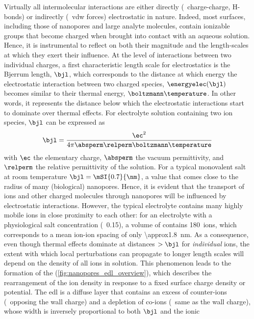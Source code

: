 %

Virtually all intermolecular interactions are either directly (\eg~charge-charge, H-bonds) or indirectly
(\eg~\gls{vdw} forces) electrostatic in nature. Indeed, most surfaces, including those of nanopores and large
analyte molecules, contain ionizable groups that become charged when brought into contact with an aqueous
solution. Hence, it is instrumental to reflect on both their magnitude and the length-scales at which they
exert their influence. At the level of interactions between two individual charges, a first characteristic
length scale for electrostatics is the Bjerrum length, $\bjl$, which corresponds to the distance at which
energy the electrostatic interaction between two charged species, $\energyelec (\bjl)$ becomes similar to
their thermal energy, $\boltzmann \temperature$. In other words, it represents the distance below which the
electrostatic interactions start to dominate over thermal effects. For electrolyte solution containing two ion
species, $\bjl$ can be expressed as~\cite{Bocquet-2010}
%
\begin{equation}\label{eq:nanopores_bjerrum_length}
  \bjl = \dfrac{\ec^2}{4 \pi \absperm \relperm \boltzmann \temperature}
\end{equation}
%
with $\ec$ the elementary charge, $\absperm$ the vacuum permittivity, and $\relperm$ the relative permittivity
of the solution. For a typical monovalent salt at room temperature $\bjl = \mSI{0.7}{\nm}$, a value that comes
close to the radius of many (biological) nanopores. Hence, it is evident that the transport of ions and other
charged molecules through nanopores will be influenced by electrostatic interactions. However, the typical
electrolyte contains many highly mobile ions in close proximity to each other: for an electrolyte with a
physiological salt concentration (\eg~\SI{0.15}{\Molar}), a volume of  contains
180~ions, which corresponds to a mean ion-ion spacing of only \SI{\approx1.8}{\nm}. As a consequence, even
though thermal effects dominate at distances $>\bjl$ for \emph{individual} ions, the extent with which local
perturbations can propagate to longer length scales will depend on the density of all ions in solution. This
phenomenon leads to the formation of the  (\cref{fig:nanopores_edl_overview}), which describes
the rearrangement of the ion density in response to a fixed surface charge density or potential. The \gls{edl}
is a diffuse layer that contains an excess of counter-ions (\ie~opposing the wall charge) and a depletion of
co-ions (\ie~same as the wall charge), whose width is inversely proportional to both $\bjl$ and the ionic
